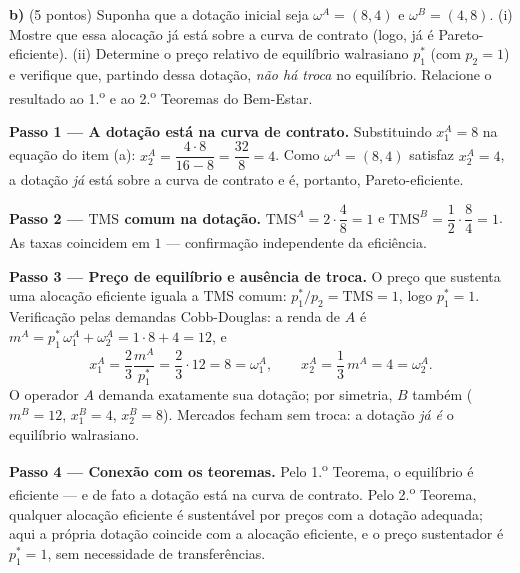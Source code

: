 \textbf{b)} (5 pontos) Suponha que a dotação inicial seja $\omega^A = (8,4)$ e $\omega^B = (4,8)$. (i) Mostre que essa alocação já está sobre a curva de contrato (logo, já é Pareto-eficiente). (ii) Determine o preço relativo de equilíbrio walrasiano $p_1^{*}$ (com $p_2=1$) e verifique que, partindo dessa dotação, \emph{não há troca} no equilíbrio. Relacione o resultado ao 1.\textsuperscript{o} e ao 2.\textsuperscript{o} Teoremas do Bem-Estar.
\resolucaobox{5.5cm}
\begin{solucao}
\textbf{Passo 1 --- A dotação está na curva de contrato.} Substituindo $x_1^A = 8$ na equação do item (a): $x_2^A = \dfrac{4\cdot 8}{16 - 8} = \dfrac{32}{8} = 4$. Como $\omega^A = (8,4)$ satisfaz $x_2^A = 4$, a dotação \emph{já} está sobre a curva de contrato e é, portanto, Pareto-eficiente.

\textbf{Passo 2 --- $\text{TMS}$ comum na dotação.} $\text{TMS}^A = 2\cdot\dfrac{4}{8} = 1$ e $\text{TMS}^B = \dfrac12\cdot\dfrac{8}{4} = 1$. As taxas coincidem em $1$ --- confirmação independente da eficiência.

\textbf{Passo 3 --- Preço de equilíbrio e ausência de troca.} O preço que sustenta uma alocação eficiente iguala a $\text{TMS}$ comum: $p_1^{*}/p_2 = \text{TMS} = 1$, logo $p_1^{*} = 1$. Verificação pelas demandas Cobb-Douglas: a renda de $A$ é $m^A = p_1^{*}\,\omega_1^A + \omega_2^A = 1\cdot 8 + 4 = 12$, e
\[ x_1^A = \frac{2}{3}\frac{m^A}{p_1^{*}} = \frac{2}{3}\cdot 12 = 8 = \omega_1^A, \qquad x_2^A = \frac{1}{3}\,m^A = 4 = \omega_2^A. \]
O operador $A$ demanda exatamente sua dotação; por simetria, $B$ também ($m^B=12$, $x_1^B=4$, $x_2^B=8$). Mercados fecham sem troca: a dotação \emph{já é} o equilíbrio walrasiano.

\textbf{Passo 4 --- Conexão com os teoremas.} Pelo 1.\textsuperscript{o} Teorema, o equilíbrio é eficiente --- e de fato a dotação está na curva de contrato. Pelo 2.\textsuperscript{o} Teorema, qualquer alocação eficiente é sustentável por preços com a dotação adequada; aqui a própria dotação coincide com a alocação eficiente, e o preço sustentador é $p_1^{*}=1$, sem necessidade de transferências.


\end{solucao}
